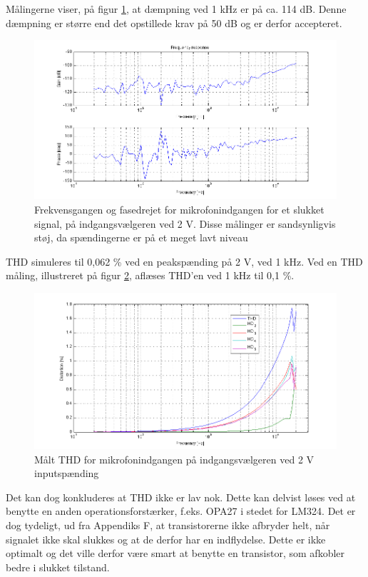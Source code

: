 Målingerne viser, på figur \ref{fig:indaccept:slukketmaaling}, at dæmpning ved 1 kHz er på ca. 114 dB. Denne dæmpning er større end det opstillede krav på 50 dB og er derfor accepteret.
\begin{figure}[h]
\centering
\includegraphics[width=\textwidth]{maalerapporter/indgangsvaelger/Indgangsvlger-mic-2v-slukket-frek.png}
\caption{Frekvensgangen og fasedrejet for mikrofonindgangen for et slukket signal, på indgangsvælgeren ved 2 V. Disse målinger er sandsynligvis støj, da spændingerne er på et meget lavt niveau}
\label{fig:indaccept:slukketmaaling}
\end{figure}	

THD simuleres til 0,062 \% ved en peakspænding på 2 V, ved 1 kHz. Ved en THD måling, illustreret på figur \ref{fig:accind:thd2v}, aflæses THD'en ved 1 kHz til 0,1 \%. 
\begin{figure}[h]
\centering
\includegraphics[width=\textwidth]{maalerapporter/indgangsvaelger/Indgangsvlger-mic-2v-thd.png}
\caption{Målt THD for mikrofonindgangen på indgangsvælgeren ved 2 V inputspænding}
\label{fig:accind:thd2v}
\end{figure}
Det kan dog konkluderes at THD ikke er lav nok. Dette kan delvist løses ved at benytte en anden operationsforstærker, f.eks. OPA27 i stedet for LM324. Det er dog tydeligt, ud fra Appendiks F, at transistorerne ikke afbryder helt, når signalet ikke skal slukkes og at de derfor har en indflydelse. Dette er ikke optimalt og det ville derfor være smart at benytte en transistor, som afkobler bedre i slukket tilstand.

